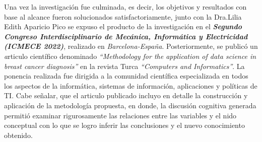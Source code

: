 Una vez la investigación fue culminada, es decir, los objetivos y resultados con base al alcance fueron solucionados satisfactoriamente, junto con la Dra.Lilia Edith Aparicio Pico se expuso el producto de la investigación en el \textit{ \textbf{Segundo Congreso Interdisciplinario de Mecánica, Informática y Electricidad (ICMECE 2022)}}, realizado en \textit{Barcelona-España}. Posteriormente, se publicó un \textit articulo científico denominado \textit{``Methodology for the application of data science in breast cancer diagnosis''} en la revista Turca \textit{``Computers and Informatics''}. La ponencia realizada fue dirigida a la comunidad científica especializada en todos los aspectos de la informática, sistemas de información, aplicaciones y políticas de TI. Cabe señalar, que el articulo publicado incluyo en detalle la construcción y aplicación de la metodología propuesta, en donde, la discusión cognitiva generada permitió examinar rigurosamente las relaciones entre las variables y el nido conceptual con lo que se logro inferir las conclusiones y el nuevo conocimiento obtenido.



